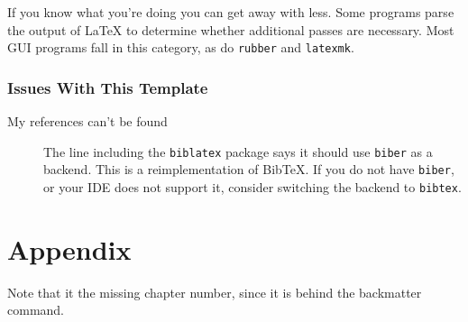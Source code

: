 \documentclass[8pt, %
a5paper, %
twoside, %
openright, %
abstract=off, %
DIV=11,      %
BCOR=8mm]{scrbook} %
\begin{document}
    If  you know  what  you're doing  you  can get  away  with less.   Some
    programs parse the  output of \LaTeX{} to  determine whether additional
    passes are necessary.  Most GUI programs fall in this category, as do
    \verb+rubber+ and \verb+latexmk+.

    \subsection{Issues With This Template}
    \begin{description}
        \item [My references can't be found] 
            The line including the \texttt{biblatex} package says it should
            use \texttt{biber} as a backend.  This is a reimplementation of
            BibTeX. If you do not have \texttt{biber}, or your IDE does not
            support it, consider switching the backend to \texttt{bibtex}.
    \end{description}


\blinddocument



    \backmatter

    \chapter{Appendix}
    Note that it the missing chapter number,  since it is behind
    the backmatter command.

    \FloatBarrier

    \begin{singlespacing}
        \printbibliography
    \end{singlespacing}
\end{document}
